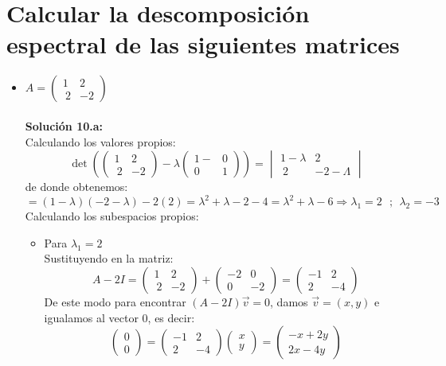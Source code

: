 \section{Calcular la descomposición espectral de las siguientes matrices}
\begin{itemize}
    \item $A=\begin{pmatrix}1&2\\ \:2&-2\end{pmatrix}$\\\\
    \textbf{Soluci\'on 10.a:}\\
    Calculando los valores propios:
    $$\det\left(\begin{pmatrix}1&2\\ \:2&-2\end{pmatrix}-\lambda \begin{pmatrix}1-&0\\ 0&1\end{pmatrix}  \right)=\begin{vmatrix}1-\lambda&2\\ \:2&-2-\Lambda\end{vmatrix}$$
    de donde obtenemos:
    $$=(1-\lambda)(-2-\lambda)-2(2)=\lambda^2+\lambda-2-4=\lambda^2+\lambda-6\Rightarrow \lambda_1=2~~~;~~ \lambda_2=-3$$
    Calculando los subespacios propios:
    \begin{itemize}
        \item Para $\lambda_1=2$\\
        Sustituyendo en la matriz:
        \[A-2I=\begin{pmatrix}1&2\\ \:2&-2\end{pmatrix}+ \begin{pmatrix}-2&0\\ 0&-2\end{pmatrix}=\begin{pmatrix}-1&2\\ 2&-4\end{pmatrix}\]
        De este modo para encontrar $(A-2I)\Vec{v}=0$, damos $\vec{v}=(x,y)$ e igualamos al vector 0, es decir:
        \[\begin{pmatrix}0\\0\end{pmatrix}=\begin{pmatrix}-1&2\\ 2&-4\end{pmatrix}\begin{pmatrix}x\\y\end{pmatrix}=\begin{pmatrix}-x+2y\\2x-4y\end{pmatrix}\]

\end{itemize}
\end{itemize}
